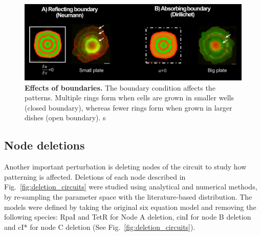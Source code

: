 \begin{figure}[H] %
    \centering
    \begin{adjustbox}{center}
        \includegraphics[width=1\textwidth]{chapters/Chapter 3/boundary_conditions_colony} %
    \end{adjustbox}
    \caption{\textbf{Effects of boundaries.} The boundary condition affects the patterns. Multiple rings form when cells are grown in smaller wells (closed boundary), whereas fewer rings form when grown in larger dishes (open boundary). s}
    \label{fig:boundary_conditions_colony}
\end{figure}

\subsection{Node deletions}
Another important perturbation is deleting nodes of the circuit to study how patterning is affected.
Deletions of each node described in Fig.~\ref{fig:deletion_circuits} were studied using analytical and numerical methods, by re-sampling the parameter space with the literature-based distribution.
The models were defined by taking the original six equation model and removing the following species: RpaI and TetR for Node A deletion, cinI for node B deletion and cI* for node C deletion (See Fig.~\ref{fig:deletion_circuits}).

